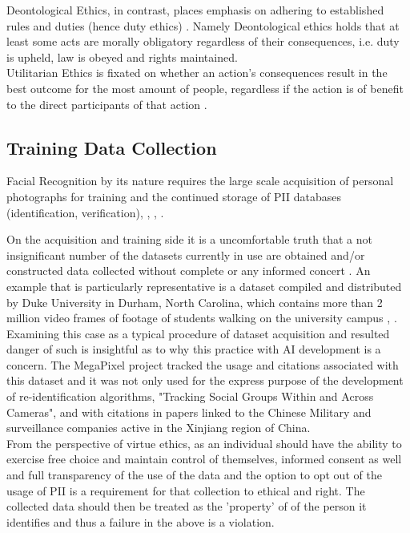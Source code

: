 \documentclass[11pt]{article}
\begin{document}
Deontological Ethics, in contrast, places emphasis on adhering to established rules and duties (hence duty ethics) \cite{sep-ethics-deontological}. Namely Deontological ethics holds that at least some acts are morally obligatory regardless of their consequences, i.e. duty is upheld, law is obeyed and rights maintained.\\

Utilitarian Ethics is fixated on whether an action's consequences result in the best outcome for the most amount of people, regardless if the action is of benefit to the direct participants of that action \cite{sep-consequentialism}. 

\subsection{Training Data Collection}
Facial Recognition by its nature requires the large scale acquisition of personal photographs for training and the continued storage of PII databases (identification, verification), \cite{ethics_book}, \cite{nature_main}, \cite{thales}. 

On the acquisition and training side it is a uncomfortable truth that a not insignificant number of the datasets currently in use are obtained and/or constructed data collected without complete or any informed concert \cite{nature_main}. An example that is particularly representative is a dataset compiled and distributed by Duke University in Durham, North Carolina, which contains more than 2 million video frames of footage of students walking on the university campus \cite{nature_main}, \cite{megapixel}. Examining this case as a typical procedure of dataset acquisition and resulted danger of such is insightful as to why this practice with AI development is a concern. The MegaPixel project \cite{megapixel} tracked the usage and citations associated with this dataset and it was not only used for the express purpose of the development of re-identification algorithms, "Tracking Social Groups Within and Across Cameras", and with citations in papers linked to the Chinese Military and surveillance companies active in the Xinjiang region of China.\\

From the perspective of virtue ethics, as an individual should have the ability to exercise free choice and maintain control of themselves, informed consent as well and full transparency of the use of the data and the option to opt out of the usage of PII is a requirement for that collection to ethical and right. The collected data should then be treated as the 'property' of of the person it identifies and thus a failure in the above is a violation.
\end{document}
